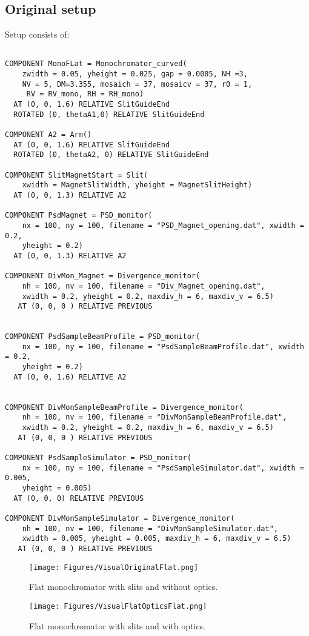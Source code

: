 \subsection{Original setup}
Setup consists of:
\lstset {language=C++}
\begin{lstlisting}

COMPONENT MonoFLat = Monochromator_curved(
    zwidth = 0.05, yheight = 0.025, gap = 0.0005, NH =3,
    NV = 5, DM=3.355, mosaich = 37, mosaicv = 37, r0 = 1,
     RV = RV_mono, RH = RH_mono)
  AT (0, 0, 1.6) RELATIVE SlitGuideEnd
  ROTATED (0, thetaA1,0) RELATIVE SlitGuideEnd

COMPONENT A2 = Arm()
  AT (0, 0, 1.6) RELATIVE SlitGuideEnd
  ROTATED (0, thetaA2, 0) RELATIVE SlitGuideEnd

COMPONENT SlitMagnetStart = Slit(
    xwidth = MagnetSlitWidth, yheight = MagnetSlitHeight)
  AT (0, 0, 1.3) RELATIVE A2

COMPONENT PsdMagnet = PSD_monitor(
    nx = 100, ny = 100, filename = "PSD_Magnet_opening.dat", xwidth = 0.2,
    yheight = 0.2)
  AT (0, 0, 1.3) RELATIVE A2

COMPONENT DivMon_Magnet = Divergence_monitor(
    nh = 100, nv = 100, filename = "Div_Magnet_opening.dat",
    xwidth = 0.2, yheight = 0.2, maxdiv_h = 6, maxdiv_v = 6.5)
   AT (0, 0, 0 ) RELATIVE PREVIOUS


COMPONENT PsdSampleBeamProfile = PSD_monitor(
    nx = 100, ny = 100, filename = "PsdSampleBeamProfile.dat", xwidth = 0.2,
    yheight = 0.2)
  AT (0, 0, 1.6) RELATIVE A2


COMPONENT DivMonSampleBeamProfile = Divergence_monitor(
    nh = 100, nv = 100, filename = "DivMonSampleBeamProfile.dat",
    xwidth = 0.2, yheight = 0.2, maxdiv_h = 6, maxdiv_v = 6.5)
   AT (0, 0, 0 ) RELATIVE PREVIOUS

COMPONENT PsdSampleSimulator = PSD_monitor(
    nx = 100, ny = 100, filename = "PsdSampleSimulator.dat", xwidth = 0.005,
    yheight = 0.005)
  AT (0, 0, 0) RELATIVE PREVIOUS

COMPONENT DivMonSampleSimulator = Divergence_monitor(
    nh = 100, nv = 100, filename = "DivMonSampleSimulator.dat",
    xwidth = 0.005, yheight = 0.005, maxdiv_h = 6, maxdiv_v = 6.5)
   AT (0, 0, 0 ) RELATIVE PREVIOUS
\end{lstlisting}
\begin{figure}[H]\centering
\texttt{[image: Figures/VisualOriginalFlat.png]}
\caption{Flat monochromator with slits and without optics.}
\texttt{[image: Figures/VisualFlatOpticsFlat.png]}
\caption{Flat monochromator with slits and with optics.}
\end{figure}


